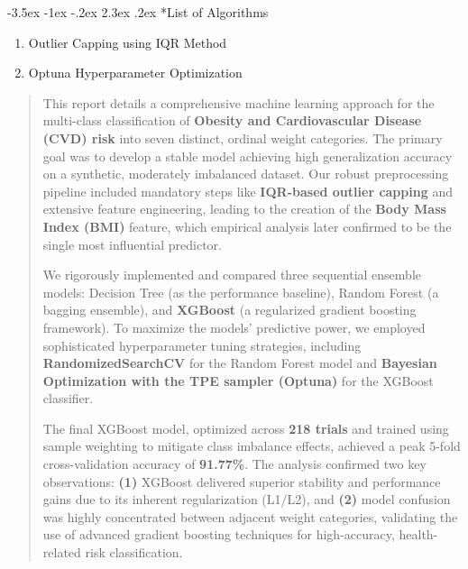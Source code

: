 \documentclass[12pt,a4paper]{article}
\makeatletter
\renewcommand{\section}{\@startsection{section}{1}{\z@}%
                                   {-3.5ex \@plus -1ex \@minus -.2ex}%
                                   {2.3ex \@plus .2ex}%
                                   {\normalfont\Large\bfseries\vspace{0.5\baselineskip}}}
\makeatother
\begin{document}
\tableofcontents
\newpage

\listoffigures
\newpage

\listoftables
\newpage

\section*{List of Algorithms}
\begin{enumerate}
    \item Outlier Capping using IQR Method
    \item Optuna Hyperparameter Optimization
\end{enumerate}
\newpage

\begin{abstract}
This report details a comprehensive machine learning approach for the multi-class classification of \textbf{Obesity and Cardiovascular Disease (CVD) risk} into seven distinct, ordinal weight categories. The primary goal was to develop a stable model achieving high generalization accuracy on a synthetic, moderately imbalanced dataset. Our robust preprocessing pipeline included mandatory steps like \textbf{IQR-based outlier capping} and extensive feature engineering, leading to the creation of the \textbf{Body Mass Index (BMI)} feature, which empirical analysis later confirmed to be the single most influential predictor.

\vspace{0.5\baselineskip}

We rigorously implemented and compared three sequential ensemble models: Decision Tree (as the performance baseline), Random Forest (a bagging ensemble), and \textbf{XGBoost} (a regularized gradient boosting framework). To maximize the models' predictive power, we employed sophisticated hyperparameter tuning strategies, including \textbf{RandomizedSearchCV} for the Random Forest model and \textbf{Bayesian Optimization with the TPE sampler (Optuna)} for the XGBoost classifier.

\vspace{0.5\baselineskip}

The final XGBoost model, optimized across \textbf{218 trials} and trained using sample weighting to mitigate class imbalance effects, achieved a peak 5-fold cross-validation accuracy of \textbf{91.77\%}. The analysis confirmed two key observations: \textbf{(1)} XGBoost delivered superior stability and performance gains due to its inherent regularization (L1/L2), and \textbf{(2)} model confusion was highly concentrated between adjacent weight categories, validating the use of advanced gradient boosting techniques for high-accuracy, health-related risk classification.
\end{abstract}
\end{document}
